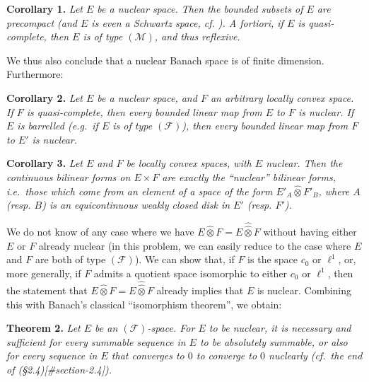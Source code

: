 \documentclass[british]{article}
\newenvironment{itenv}[1]
  {\phantomsection\par\smallskip\noindent\textbf{#1.}\itshape}
  {\par\smallskip}
\begin{document}
\protect{}\label{section-2-corollary-1}
\begin{itenv}{Corollary 1}
Let \(E\) be a nuclear space. Then the bounded subsets of \(E\) are
precompact (and \(E\) is even a Schwartz space, cf. \autocite{6}). A
fortiori, if \(E\) is quasi-complete, then \(E\) is of type
\((\mathscr{M})\), and thus reflexive.

\end{itenv}

We thus also conclude that a nuclear Banach space is of finite
dimension. Furthermore:

\protect{}\label{section-2-corollary-2}
\begin{itenv}{Corollary 2}
Let \(E\) be a nuclear space, and \(F\) an arbitrary locally convex
space. If \(F\) is quasi-complete, then every bounded linear map from
\(E\) to \(F\) is nuclear. If \(E\) is barrelled (e.g.~if \(E\) is of
type \((\mathscr{F})\)), then every bounded linear map from \(F\) to
\(E'\) is nuclear.

\end{itenv}

\protect{}\label{section-2-corollary-3}
\begin{itenv}{Corollary 3}
Let \(E\) and \(F\) be locally convex spaces, with \(E\) nuclear. Then
the continuous bilinear forms on \(E\times F\) are exactly the
``nuclear'' bilinear forms, i.e.~those which come from an element of a
space of the form \(E'_A\hat{\otimes}F'_B\), where \(A\) (resp. \(B\))
is an equicontinuous weakly closed disk in \(E'\) (resp. \(F'\)).

\end{itenv}

We do not know of any case where we have
\(E\hat{\otimes}F=E\hat{\hat{\otimes}}F\) without having either \(E\) or
\(F\) already nuclear (in this problem, we can easily reduce to the case
where \(E\) and \(F\) are both of type \((\mathscr{F})\)). We can show
that, if \(F\) is the space \(c_0\) or \(\ell^1\), or, more generally,
if \(F\) admits a quotient space isomorphic to either \(c_0\) or
\(\ell^1\), then the statement that
\(E\hat{\otimes}F=E\hat{\hat{\otimes}}F\) already implies that \(E\) is
nuclear. Combining this with Banach's classical ``isomorphism theorem'',
we obtain:

\protect{}\label{section-2-theorem-2}
\begin{itenv}{Theorem 2}
Let \(E\) be an \((\mathscr{F})\)-space. For \(E\) to be nuclear, it is
necessary and sufficient for every summable sequence in \(E\) to be
absolutely summable, or also for every sequence in \(E\) that converges
to \(0\) to converge to \(0\) nuclearly (cf.~the end of
(§2.4){[}\#section-2.4{]}).

\end{itenv}
\end{document}
